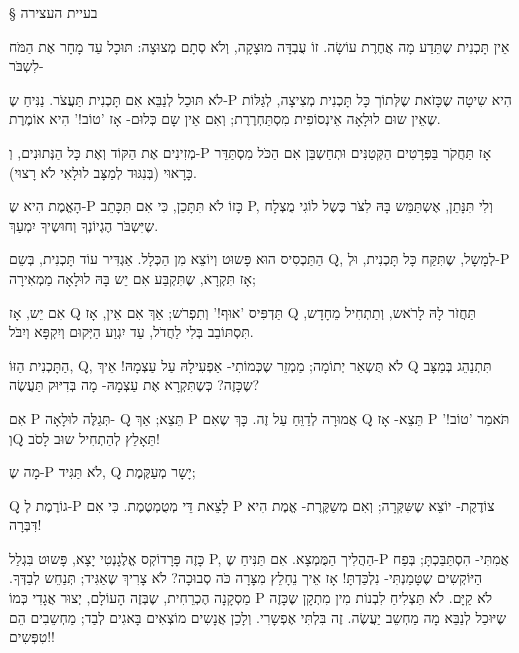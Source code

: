 § בעיית העצירה

\leavevmode
\newline
אֵין תָּכְנִית שֶתֵּדַע מָה אֲחֶרֶת עוֹשָׂה.
זוֹ עֻבְדָּה מוּצָקָה, וְלֹא סְתָם מְצוּצָה:
תּוּכָל עַד מָחָר אֶת הַמֹּח לִשְבֹּר-

לֹא תּוּכַל לְנַבֵּא אִם תָּכְנִית תַּעֲצֹר.
נַנִּיחַ שֶ-P הִיא שִיטָה שֶכָּזֹאת
שֶלְּתוֹך כָּל תָּכְנִית מְצִיצָה, לְגַּלּוֹת
שֶאֵין שוּם לוּלָאָה אֵינְסוֹפִית מִסְתַּחְרֶרֶת;
וְאִם אֵין שָם כְּלוּם- אָז 'טוֹב!' הִיא אוֹמֶרֶת.

מְזִינִים אֶת הַקּוֹד וְאֶת כָּל הַנְּתוּנִים,
וְ-P אָז תַּחֲקֹר בַּפְּרָטִים הַקְּטַנִּים
וּתְחַשְבֵּן אִם הַכֹּל מִסְתַּדֵּר כָּרָאוּי
(בְּנִגּוּד לְמַצָּב לוּלָאִי לֹא רָצוּי).

הָאֱמֶת הִיא שֶ-P כָּזוֹ לֹא תִּתָּכֵן,
כִּי אִם תִּכָּתֵב P, וְלִי תִּנָּתֵן,
אֶשְתַּמֵּש בָּהּ לִצֹּר כֶּשֶל לוֹגִי מֻצְלָח
שֶיִּשְבֹּר הֶגְיוֹנְךָ וְחוּשֶיךָ יִמְעַךְ.
\leavevmode
\newline

הַתַּכְסִיס הוּא פָּשוּט וְיוֹצֵא מִן הַכְּלָל.
אַגְדִּיר עוֹד תָּכְנִית, בְּשֵם Q, לְמָשָל,
שֶתִּקַּח כָּל תָּכְנִית, וּלְ-P אָז תִּקְרָא,
שֶתִּקְבַּע אִם יֵש בָּהּ לוּלָאָה מַמְאִירָה;
\leavevmode
\newline

אִם יֵש, אָז Q תַּדְפִּיס 'אוּף!' וְתִפְרֹש;
אַךְ אִם אֵין, אָז Q תַּחֲזֹר לָהּ לָרֹאש,
וְתַתְחִיל מֵחָדָש, תִּסְתּוֹבֵב בְּלִי לַחֲדֹל,
עַד יִגְוַע הַיְּקוּם וְיִקְפָּא וְיִבֹּל.

\leavevmode
\newline

הַתָּכְנִית הַזּוֹ, Q, לֹא תֻּשְאַר יְתוֹמָה;
מַמְזֵר שֶכְּמוֹתִי- אַפְעִילָהּ עַל עַצְמָהּ!
אֵיךְ Q תִּתְנַהֵג בְּמַצָּב שֶכָּזֶה?
כְּשֶתִּקְרָא אֶת עַצְמָהּ- מָה בְּדִיּוּק תַּעֲשֶׂה?
\leavevmode
\newline

אִם P תְּגַלֶּה לוּלָאָה- Q תֵּצֵא;
אַךְ P אֲמוּרָה לְדַוֵּחַ עַל זֶה.
כָּךְ שֶאִם Q תֵּצֵא- אָז P תֹּאמַר 'טוֹב!'
וְQ תֵּאָלֵץ לְהַתְחִיל שוּב לָסֹב!
\leavevmode
\newline

מָה שֶ-P לֹא תַּגִּיד, Q יָשָר מְעַקֶּמֶת;

Q גוֹרֶמֶת לְ-P לָצֵאת דֵּי מְטֻמְטֶמֶת.
כִּי אִם P צוֹדֶקֶת- יוֹצֵא שֶשִּקְּרָה;
וְאִם מְשַקֶּרֶת- אֱמֶת הִיא דִּבְּרָה!
\leavevmode
\newline

כָּזֶה פָּרָדוֹקְס אֱלֶגָנְטִי יָצָא,
פָּשוּט בִּגְלַל P, הַהֲלִיך הַמֻּמְצָא.
אִם תַּנִּיחַ שֶ-P אֲמִתִּי- הִסְתַּבַּכְתָּ;
בְּפַח הַיּוֹקְשִים שֶטָּמַנְתִּי- נִלְכַּדְתָּ!
\leavevmode
\newline
אָז אֵיך נֵחָלֵץ מִצָּרָה כֹּה סְבוּכָה?
לֹא צָרִיךְ שֶאַגִּיד; תְּנַחֵש לְבַדְּךָ.
מַסְקָנָה הֶכְרֵחִית, שֶבְּזֶה הָעוֹלָם,
יְצוּר אֲגָדִי כְּמוֹ P לֹא קַיָּם.
\leavevmode
\newline
לֹא תַּצְלִיחַ לִבְנוֹת מִין מִתְקָן שֶכָּזֶה
שֶיּוּכַל לְנַבֵּא מָה מַחְשֵב יַעֲשֶׂה.
זֶה בִּלְתִּי אֶפְשָרִי. וְלָכֵן אֲנָשִים
מוֹצְאִים בָּאגִים לְבַד; מַחְשֵבִים הֵם טִפְּשִים!!
\leavevmode
\newline
